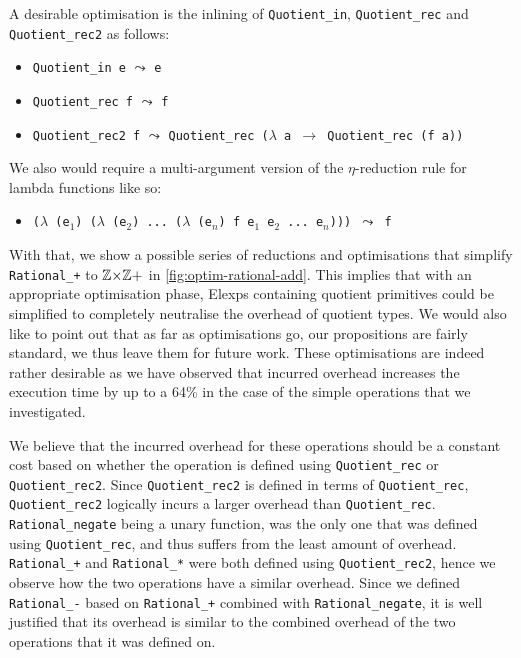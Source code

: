 \documentclass[12pt,twoside,maitrise]{dms}
\theoremstyle{definition}
\numberwithin{equation}{section}
\numberwithin{table}{chapter}
\numberwithin{figure}{chapter}
\newcommand\id[1] {\texttt{#1}}
\newcommand\fn[1] {\texttt{#1}}
\begin{document}
A desirable optimisation is the inlining of \id{Quotient\_in}, \id{Quotient\_rec} and
\id{Quotient\_rec2} as follows:

\begin{itemize}
  \item{\fn{Quotient\_in e} $\leadsto$ \id{e}}

  \item{\fn{Quotient\_rec f} $\leadsto$ \id{f}}

  \item{\fn{Quotient\_rec2 f} $\leadsto$ \fn{Quotient\_rec ($\lambda$ a $\rightarrow$ Quotient\_rec (f a))}}
\end{itemize}

We also would require a multi-argument version of the $\eta$-reduction rule for
lambda functions like so:

\begin{itemize}
  \item{\fn{($\lambda$ (e$_1$) ($\lambda$ (e$_2$) ... ($\lambda$ (e$_n$) f e$_1$ e$_2$ ... e$_n$))) $\leadsto$ f}}
\end{itemize}

With that, we show a possible series of reductions and optimisations that
simplify \fn{Rational\_+} to $\mathbb{Z}{\times}\mathbb{Z}+$ in \autoref{fig:optim-rational-add}.
This implies that with an appropriate optimisation phase, Elexps containing
quotient primitives could be simplified to completely neutralise the overhead of
quotient types. We would also like to point out that as far as optimisations go,
our propositions are fairly standard, we thus leave them for future work. These
optimisations are indeed rather desirable as we have observed that incurred
overhead increases the execution time by up to a 64\% in the case of the simple
operations that we investigated.

We believe that the incurred overhead for these operations should be a constant
cost based on whether the operation is defined using \id{Quotient\_rec} or
\id{Quotient\_rec2}. Since \id{Quotient\_rec2} is defined in terms of
\id{Quotient\_rec}, \id{Quotient\_rec2} logically incurs a larger overhead than
\id{Quotient\_rec}. \id{Rational\_negate} being a unary function, was the only
one that was defined using \id{Quotient\_rec}, and thus suffers from the least
amount of overhead. \id{Rational\_+} and \id{Rational\_*} were both defined
using \id{Quotient\_rec2}, hence we observe how the two operations have a
similar overhead. Since we defined \id{Rational\_-} based on \id{Rational\_+}
combined with \id{Rational\_negate}, it is well justified that its overhead is
similar to the combined overhead of the two operations that it was defined on.
\end{document}
